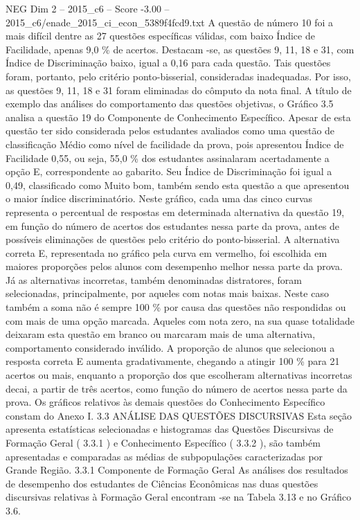 \begin{textsample}{NEG Dim 2 – 2015\_c6 – Score -3.00 – 2015\_c6/enade\_2015\_ci\_econ\_5389f4fcd9.txt}
A questão de número 10 foi a mais difícil dentre as 27 questões específicas válidas, com baixo Índice de Facilidade, apenas 9,0 \% de acertos.
Destacam -se, as questões 9, 11, 18 e 31, com Índice de Discriminação baixo, igual a 0,16 para cada questão.
Tais questões foram, portanto, pelo critério ponto-bisserial, consideradas inadequadas.
Por isso, as questões 9, 11, 18 e 31 foram eliminadas do cômputo da nota final.
A título de exemplo das análises do comportamento das questões objetivas, o Gráfico 3.5 analisa a questão 19 do Componente de Conhecimento Específico.
Apesar de esta questão ter sido considerada pelos estudantes avaliados como uma questão de classificação Médio como nível de facilidade da prova, pois apresentou Índice de Facilidade 0,55, ou seja, 55,0 \% dos estudantes assinalaram acertadamente a opção E, correspondente ao gabarito.
Seu Índice de Discriminação foi igual a 0,49, classificado como Muito bom, também sendo esta questão a que apresentou o maior índice discriminatório.
Neste gráfico, cada uma das cinco curvas representa o percentual de respostas em determinada alternativa da questão 19, em função do número de acertos dos estudantes nessa parte da prova, antes de possíveis eliminações de questões pelo critério do ponto-bisserial.
A alternativa correta E, representada no gráfico pela curva em vermelho, foi escolhida em maiores proporções pelos alunos com desempenho melhor nessa parte da prova.
Já as alternativas incorretas, também denominadas distratores, foram selecionadas, principalmente, por aqueles com notas mais baixas.
Neste caso também a soma não é sempre 100 \% por causa das questões não respondidas ou com mais de uma opção marcada.
Aqueles com nota zero, na sua quase totalidade deixaram esta questão em branco ou marcaram mais de uma alternativa, comportamento considerado inválido.
A proporção de alunos que selecionou a resposta correta E aumenta gradativamente, chegando a atingir 100 \% para 21 acertos ou mais, enquanto a proporção dos que escolheram alternativas incorretas decai, a partir de três acertos, como função do número de acertos nessa parte da prova.
Os gráficos relativos às demais questões do Conhecimento Específico constam do Anexo I. 3.3 ANÁLISE DAS QUESTÕES DISCURSIVAS Esta seção apresenta estatísticas selecionadas e histogramas das Questões Discursivas de Formação Geral ( 3.3.1 ) e Conhecimento Específico ( 3.3.2 ), são também apresentadas e comparadas as médias de subpopulações caracterizadas por Grande Região. 3.3.1 Componente de Formação Geral As análises dos resultados de desempenho dos estudantes de Ciências Econômicas nas duas questões discursivas relativas à Formação Geral encontram -se na Tabela 3.13 e no Gráfico 3.6.

\end{textsample}
